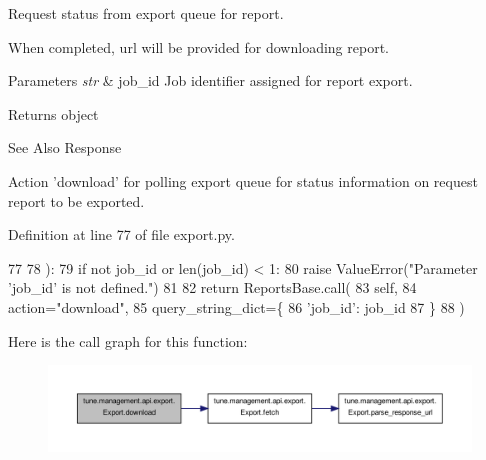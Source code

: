 Request status from export queue for report. 

When completed, url will be provided for downloading report. 
\begin{DoxyParams}{Parameters}
{\em str} & job\-\_\-id Job identifier assigned for report export. \\
\hline
\end{DoxyParams}
\begin{DoxyReturn}{Returns}
object 
\end{DoxyReturn}
\begin{DoxySeeAlso}{See Also}
Response
\end{DoxySeeAlso}
\begin{DoxyVerb}     Action 'download' for polling export queue for status information on
     request report to be exported.\end{DoxyVerb}
 

Definition at line 77 of file export.\-py.


\begin{DoxyCode}
77 
78     ):
79         \textcolor{keywordflow}{if} \textcolor{keywordflow}{not} job\_id \textcolor{keywordflow}{or} len(job\_id) < 1:
80             \textcolor{keywordflow}{raise} ValueError(\textcolor{stringliteral}{"Parameter 'job\_id' is not defined."})
81 
82         \textcolor{keywordflow}{return} ReportsBase.call(
83             self,
84             action=\textcolor{stringliteral}{"download"},
85             query\_string\_dict=\{
86                 \textcolor{stringliteral}{'job\_id'}: job\_id
87             \}
88         )

\end{DoxyCode}


Here is the call graph for this function\-:
\nopagebreak
\begin{figure}[H]
\begin{center}
\leavevmode
\includegraphics[width=350pt]{classtune_1_1management_1_1api_1_1export_1_1Export_a7c8f4a974ae5d915feb57bc4c3502f93_cgraph}
\end{center}
\end{figure}


